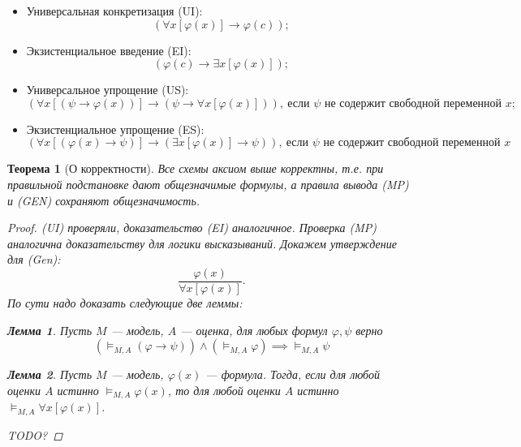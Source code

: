 \documentclass[12pt]{article}
\let\im\rightarrow
\theoremstyle{definition}
\theoremstyle{plain}
\newtheorem{theorem}{Теорема}[section]
\newtheorem{lemma}{Лемма}[section]
\theoremstyle{remark}
\begin{document}
\begin{itemize}
  \item Универсальная конкретизация (UI):
    \[
      (\forall x [\varphi(x)] \im \varphi(c));
    \]

  \item Экзистенциальное введение (EI):
    \[
      (\varphi(c) \im \exists x [\varphi(x)]);
    \]

  \item Универсальное упрощение (US):
    \[
      (\forall x [(\psi \im \varphi(x))] \im (\psi \im \forall x
      [\varphi(x)])),\ \text{если $\psi$ не содержит свободной переменной $x$};
    \]

  \item Экзистенциальное упрощение (ES):
    \[
      (\forall x [(\varphi(x) \im \psi)] \im (\exists x [\varphi(x)]
      \im \psi)),\ \text{если $\psi$ не содержит свободной переменной $x$}
    \]
\end{itemize}

\begin{theorem}[О корректности]
  Все схемы аксиом выше корректны, т.е. при правильной подстановке
  дают общезначимые формулы, а правила вывода (MP) и (GEN) сохраняют
  общезначимость.
  \begin{proof}
    (UI) проверяли, доказательство (EI) аналогичное. Проверка (MP)
    аналогична доказательству для логики высказываний. Докажем
    утверждение для (Gen):
    \[
      \frac{\varphi(x)}{\forall x [\varphi(x)]}.
    \]
    По сути надо доказать следующие две леммы:
    \begin{lemma}
      Пусть $M$ --- модель, $A$ --- оценка, для любых формул
      $\varphi, \psi$ верно
      \[
        (\models_{M,A} (\varphi \im \psi)) \land (\models_{M,A}
        \varphi) \implies \models_{M,A} \psi
      \]
    \end{lemma}
    \begin{lemma}
      Пусть $M$ --- модель, $\varphi(x)$ --- формула. Тогда, если для
      любой оценки $A$ истинно $\models_{M,A} \varphi(x)$, то для
      любой оценки $A$ истинно $\models_{M,A} \forall x [\varphi(x)]$.
    \end{lemma}
    TODO?
  \end{proof}
\end{theorem}
\end{document}
